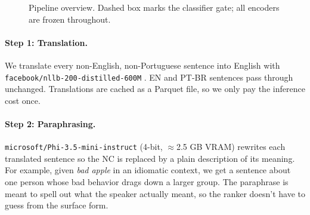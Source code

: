 \documentclass[11pt]{article}
\begin{document}
\begin{figure}[t]
\centering
{}
\caption{Pipeline overview. Dashed box marks the classifier gate; all encoders
         are frozen throughout.}
\label{fig:pipeline}
\end{figure}

\paragraph{Step 1: Translation.}
We translate every non-English, non-Portuguese sentence into English with
\texttt{facebook/nllb-200-distilled-600M} \cite{nllb2022}. EN and PT-BR
sentences pass through unchanged. Translations are cached as a Parquet file,
so we only pay the inference cost once.

\paragraph{Step 2: Paraphrasing.}
\texttt{microsoft/Phi-3.5-mini-instruct} \cite{phi3_2024} (4-bit, $\approx$2.5
GB VRAM) rewrites each translated sentence so the NC is replaced by a plain
description of its meaning. For example, given \textit{bad apple} in an
idiomatic context, we get a sentence about one person whose bad behavior drags
down a larger group. The paraphrase is meant to spell out what the speaker
actually meant, so the ranker doesn't have to guess from the surface form.
\end{document}
